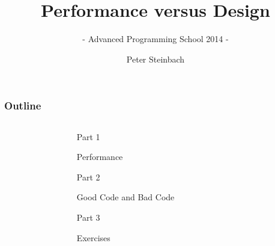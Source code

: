 \documentclass[9pt,xcolor=table]{beamer}
\begin{document}
     
 
 
\title[PerfVsDesign]{Performance versus Design}
\subtitle{- Advanced Programming School 2014 -}
\author[P. Steinbach]{Peter Steinbach}
\date{}
\addtocounter{framenumber}{-1}
\renewcommand*\inserttotalframenumber{52} 

 
{
\maketitle
}

\begin{frame}[t]
\frametitle{Outline}
\vspace{-1.5\baselineskip}
\vfill
  \begin{columns}[t]
    \begin{column}{.1\textwidth}
      \hfill
    \end{column}
    \begin{column}{.75\textwidth}
      \huge
      \vfill
      \begin{block}{Part 1}
        \begin{center}
          \huge%
          Performance
        \end{center}
      \end{block}
      \vfill
      \begin{block}{Part 2}
        \begin{center}
          \huge%
          Good Code and Bad Code
        \end{center}
      \end{block}
      \vfill
      \begin{block}{Part 3}
        \begin{center}
          \huge%
          Exercises
        \end{center}
      \end{block}
      \vfill
    \end{column}
    \begin{column}{.1\textwidth}
      \hfill
    \end{column}
  \end{columns}
\vfill
\end{frame}

\end{document}
